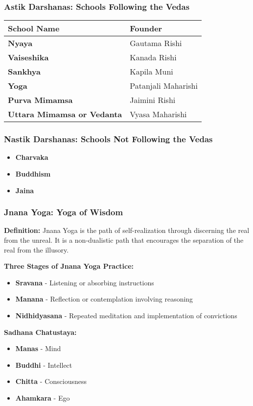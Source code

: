 \begin{frame}[fragile]\frametitle{Astik Darshanas: Schools Following the Vedas}
    \begin{tabular}{|l|l|}
    \hline
    \textbf{School Name} & \textbf{Founder} \\
    \hline
    \textbf{Nyaya} & Gautama Rishi \\
    \hline
    \textbf{Vaiseshika} & Kanada Rishi \\
    \hline
    \textbf{Sankhya} & Kapila Muni \\
    \hline
    \textbf{Yoga} & Patanjali Maharishi \\
    \hline
    \textbf{Purva Mimamsa} & Jaimini Rishi \\
    \hline
    \textbf{Uttara Mimamsa or Vedanta} & Vyasa Maharishi \\
    \hline
    \end{tabular}
\end{frame}

\begin{frame}[fragile]\frametitle{Nastik Darshanas: Schools Not Following the Vedas}
    \begin{itemize}
        \item \textbf{Charvaka}
        \item \textbf{Buddhism}
        \item \textbf{Jaina}
    \end{itemize}
\end{frame}

\begin{frame}[fragile]\frametitle{Jnana Yoga: Yoga of Wisdom}
    \textbf{Definition:} Jnana Yoga is the path of self-realization through discerning the real from the unreal. It is a non-dualistic path that encourages the separation of the real from the illusory.

    \vspace{0.5cm}
    \textbf{Three Stages of Jnana Yoga Practice:}
    \begin{itemize}
        \item \textbf{Sravana} - Listening or absorbing instructions
        \item \textbf{Manana} - Reflection or contemplation involving reasoning
        \item \textbf{Nidhidyasana} - Repeated meditation and implementation of convictions
    \end{itemize}

    \vspace{0.5cm}
    \textbf{Sadhana Chatustaya:}
    \begin{itemize}
        \item \textbf{Manas} - Mind
        \item \textbf{Buddhi} - Intellect
        \item \textbf{Chitta} - Consciousness
        \item \textbf{Ahamkara} - Ego
    \end{itemize}
\end{frame}


